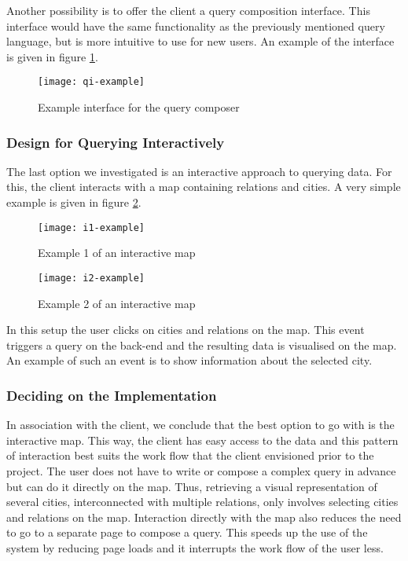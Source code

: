 Another possibility is to offer the client a query composition interface. This interface would have the same functionality as the previously mentioned query language, but is more intuitive to use for new users. An example of the interface is given in figure \ref{fig:qi-example}.

\begin{figure}[ht]
\centering
\texttt{[image: qi-example]}
\caption{Example interface for the query composer}
\label{fig:qi-example}
\end{figure}

\subsubsection{Design for Querying Interactively}

The last option we investigated is an interactive approach to querying data. For this, the client interacts with a map containing relations and cities. A very simple example is given in figure \ref{fig:i1-example}.

\begin{figure}[ht]
\centering
\texttt{[image: i1-example]}
\caption{Example 1 of an interactive map}
\label{fig:i1-example}
\end{figure}

\begin{figure}[ht]
\centering
\texttt{[image: i2-example]}
\caption{Example 2 of an interactive map}
\label{fig:i2-example}
\end{figure}

In this setup the user clicks on cities and relations on the map. This event triggers a query on the back-end and the resulting data is visualised on the map. An example of such an event is to show information about the selected city.

\subsubsection{Deciding on the Implementation}
In association with the client, we conclude that the best option to go with is the interactive map.
This way, the client has easy access to the data and this pattern of interaction best suits the work flow that the client envisioned prior to the project. The user does not have to write or compose a complex query in advance but can do it directly on the map. Thus, retrieving a visual representation of several cities, interconnected with multiple relations, only involves selecting cities and relations on the map. Interaction directly with the map also reduces the need to go to a separate page to compose a query. This speeds up the use of the system by reducing page loads and it interrupts the work flow of the user less.